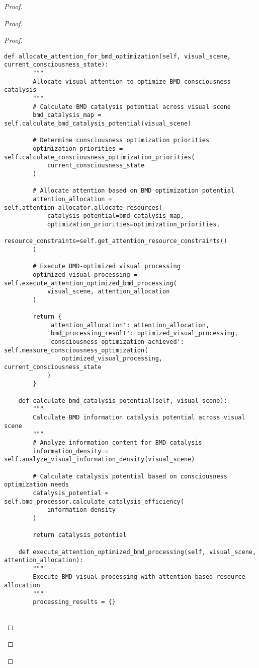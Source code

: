 \documentclass[12pt,a4paper]{article}
\begin{document}
\begin{proof}
{\begin{proof}
\begin{proof}
\begin{lstlisting}[style=pythonstyle, caption=Visual Attention BMD Resource Allocation]
    def allocate_attention_for_bmd_optimization(self, visual_scene, current_consciousness_state):
        """
        Allocate visual attention to optimize BMD consciousness catalysis
        """
        # Calculate BMD catalysis potential across visual scene
        bmd_catalysis_map = self.calculate_bmd_catalysis_potential(visual_scene)
        
        # Determine consciousness optimization priorities
        optimization_priorities = self.calculate_consciousness_optimization_priorities(
            current_consciousness_state
        )
        
        # Allocate attention based on BMD optimization potential
        attention_allocation = self.attention_allocator.allocate_resources(
            catalysis_potential=bmd_catalysis_map,
            optimization_priorities=optimization_priorities,
            resource_constraints=self.get_attention_resource_constraints()
        )
        
        # Execute BMD-optimized visual processing
        optimized_visual_processing = self.execute_attention_optimized_bmd_processing(
            visual_scene, attention_allocation
        )
        
        return {
            'attention_allocation': attention_allocation,
            'bmd_processing_result': optimized_visual_processing,
            'consciousness_optimization_achieved': self.measure_consciousness_optimization(
                optimized_visual_processing, current_consciousness_state
            )
        }
    
    def calculate_bmd_catalysis_potential(self, visual_scene):
        """
        Calculate BMD information catalysis potential across visual scene
        """
        # Analyze information content for BMD catalysis
        information_density = self.analyze_visual_information_density(visual_scene)
        
        # Calculate catalysis potential based on consciousness optimization needs
        catalysis_potential = self.bmd_processor.calculate_catalysis_efficiency(
            information_density
        )
        
        return catalysis_potential
    
    def execute_attention_optimized_bmd_processing(self, visual_scene, attention_allocation):
        """
        Execute BMD visual processing with attention-based resource allocation
        """
        processing_results = {}
        

\end{lstlisting}
\end{proof}
\end{proof}}
\end{proof}
\end{document}
